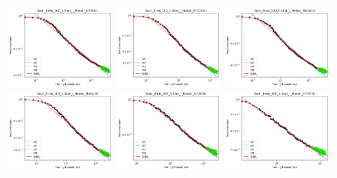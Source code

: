 \documentclass{article} %
\begin{document}
\begin{figure}[!htb]
    \centering

\includegraphics[width=0.245\textwidth]{figures/scaling_laws_benchmark_dataset_plots__all_functional_forms/birds_5___BiT_50_1.png}
\includegraphics[width=0.245\textwidth]{figures/scaling_laws_benchmark_dataset_plots__all_functional_forms/birds_5___BiT_101_3.png}
\includegraphics[width=0.245\textwidth]{figures/scaling_laws_benchmark_dataset_plots__all_functional_forms/birds_5___MiX_B_16.png}
\includegraphics[width=0.245\textwidth]{figures/scaling_laws_benchmark_dataset_plots__all_functional_forms/birds_5___MiX_L_16.png}
\includegraphics[width=0.245\textwidth]{figures/scaling_laws_benchmark_dataset_plots__all_functional_forms/birds_5___ViT_B_16.png}
\includegraphics[width=0.245\textwidth]{figures/scaling_laws_benchmark_dataset_plots__all_functional_forms/birds_5___ViT_S_16.png}

\end{figure}
\end{document}
